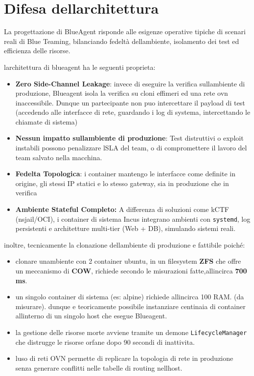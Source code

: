 \section{Difesa
dell\textquotesingle architettura}\label{difesa-dellarchitettura}

La progettazione di BlueAgent risponde alle esigenze operative tipiche
di scenari reali di Blue Teaming, bilanciando fedeltà
dell\textquotesingle ambiente, isolamento dei test ed efficienza delle
risorse.

l\textquotesingle architettura di blueagent ha le seguenti proprieta:

\begin{itemize}
\tightlist
\item
  \textbf{Zero Side-Channel Leakage}: invece di eseguire la verifica
  sull\textquotesingle ambiente di produzione, Blueagent isola la
  verifica su cloni effimeri ed una rete ovn inaccessibile. Dunque un
  partecipante non puo\textquotesingle{} intercettare il payload di test
  (accedendo alle interfacce di rete, guardando i log di systema,
  intercettando le chiamate di sistema)
\item
  \textbf{Nessun impatto sull\textquotesingle ambiente di produzione}:
  Test distruttivi o exploit instabili possono penalizzare
  l\textquotesingle SLA del team, o di compromettere il lavoro del team
  salvato nella macchina.
\item
  \textbf{Fedelta Topologica}: i container mantengo le interfacce come
  definite in origine, gli stessi IP statici e lo stesso gateway, sia in
  produzione che in verifica
\item
  \textbf{Ambiente Stateful Completo:} A differenza di soluzioni come
  kCTF (nsjail/OCI), i container di sistema Incus integrano ambienti con
  \passthrough{\lstinline!systemd!}, log persistenti e architetture
  multi-tier (Web + DB), simulando sistemi reali.
\end{itemize}

inoltre, tecnicamente la clonazione dell\textquotesingle ambiente di
produzione e\textquotesingle{} fattibile poiché:

\begin{itemize}
\tightlist
\item
  clonare un\textquotesingle ambiente con 2 container ubuntu, in un
  filesystem \textbf{ZFS} che offre un meccanismo di \textbf{COW},
  richiede secondo le misurazioni fatte,all\textquotesingle incirca
  \textbf{700 ms}.
\item
  un singolo container di sistema (es: alpine) richiede
  all\textquotesingle incirca 100 RAM. (da misurare). dunque
  e\textquotesingle{} teoricamente possibile instanziare centinaia di
  container all\textquotesingle interno di un singolo host che esegue
  Blueagent.
\item
  la gestione delle risorse morte avviene tramite un demone
  \passthrough{\lstinline!LifecycleManager!} che distrugge le risorse
  orfane dopo 90 secondi di inattivita.
\item
  l\textquotesingle uso di reti OVN permette di replicare la topologia
  di rete in produzione senza generare conflitti nelle tabelle di
  routing nell\textquotesingle host.
\end{itemize}

